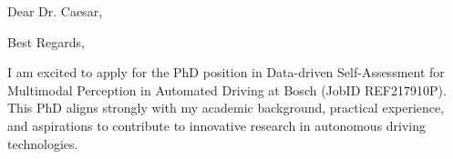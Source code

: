 \documentclass[11pt,a4paper,skipsamekey]{moderncv}
\begin{document}
	\date{\today}
	\opening{Dear Dr. Caesar,}
	\closing{Best Regards,}
	\makelettertitle
	
\begin{comment}
	- I am extremely interested in doing a PhD on Data-driven Self-Assessment for Multimodal Perception in Automated Driving
	
	- I have always had a passion for self-driving technologies:
 1.  Completing Computer Vision personal projects, 
 2.  Working in a start-up to innovate with state-of-the-art LiDAR technology,
 3.  Gaining experience in Embedded Systems to understand safety, real-time, and deployment details.
 4.  Working with numerous ROS / ROS 2 projects, a popular framework used in open source self-driving car software such as Autoware.
	
	- During my Master's degree, I worked towards this objective by:
  1. Supporting publications in Robotics
  2. Achieving top marks in a master's class on self-driving cars
  3. Completing my master's thesis in techniques for prediction of multiple-possible futures -- work that will spring-board me into research of multimodal fusion
	
	I am extremely interested in how this Ph.D. statement focus on real-world relevancy, specifically in the assessment of which objects in the scene which are imperative for autonomous decision-making.
	I am eager to develop metrics, implement solutions, and collaborate with other research in this context.  
\end{comment}

I am excited to apply for the PhD position in Data-driven Self-Assessment for Multimodal Perception in Automated Driving at Bosch (JobID REF217910P). This PhD aligns strongly with my academic background, practical experience, and aspirations to contribute to innovative research in autonomous driving technologies.
\end{document}

